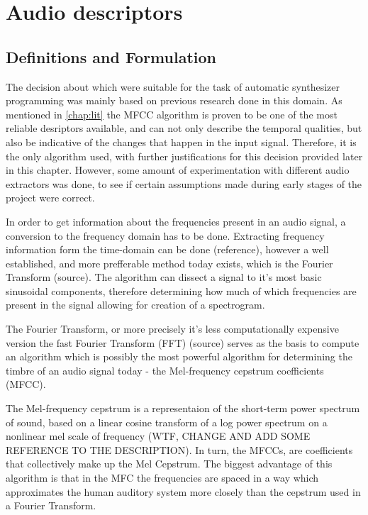 \section{Audio descriptors}
\subsection{Definitions and Formulation}

The decision about which were suitable for the task of automatic
synthesizer programming was mainly based on previous research done in
this domain. As mentioned in \autoref{chap:lit} the MFCC algorithm is
proven to be one of the most reliable desriptors available, and can
not only describe the temporal qualities, but also be indicative of
the changes that happen in the input signal\cite{terasawa_center_2005}.
Therefore, it is the only algorithm used, with further justifications
for this decision provided later in this chapter. However, some amount
of experimentation with different audio extractors was done, to see if
certain assumptions made during early stages of the project were
correct.
%

In order to get information about the frequencies present in an audio
signal, a conversion to the frequency domain has to be
done. Extracting frequency information form the time-domain can be
done (reference), however a well established, and more prefferable
method today exists, which is the Fourier Transform (source). The
algorithm can dissect a signal to it's most basic sinusoidal
components, therefore determining how much of which frequencies are
present in the signal allowing for creation of a spectrogram.

The Fourier Transform, or more precisely it's less computationally
expensive version the fast Fourier Transform (FFT) (source) serves as
the basis to compute an algorithm which is possibly the most powerful
algorithm for determining the timbre of an audio signal today - the
Mel-frequency cepstrum coefficients (MFCC).
%

The Mel-frequency cepstrum is a representaion of the short-term power
spectrum of sound, based on a linear cosine transform of a log power
spectrum on a nonlinear mel scale of frequency (WTF, CHANGE AND ADD
SOME REFERENCE TO THE DESCRIPTION). In turn, the MFCCs, are
coefficients that collectively make up the Mel Cepstrum. The biggest
advantage of this algorithm is that in the MFC the frequencies are
spaced in a way which approximates the human auditory system more
closely than the cepstrum used in a Fourier Transform. 

